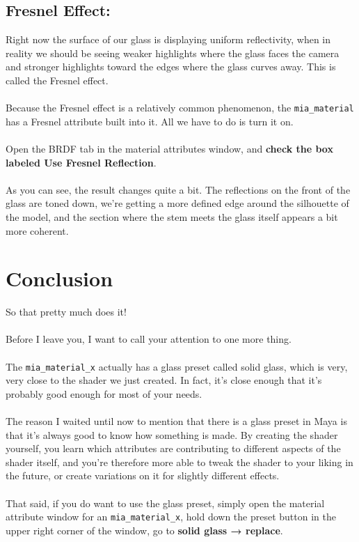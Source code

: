 \documentclass[10pt,a4paper]{article}
\begin{document}
\subsection{Fresnel Effect:}
Right now the surface of our glass is displaying uniform reflectivity, when in reality we should be seeing weaker highlights where the glass faces the camera and stronger highlights toward the edges where the glass curves away. This is called the Fresnel effect.
\\
\\
Because the Fresnel effect is a relatively common phenomenon, the \lstinline{mia_material} has a Fresnel attribute built into it. All we have to do is turn it on.
\\
\\
Open the BRDF tab in the material attributes window, and \textbf{check the box labeled Use Fresnel Reflection}.
\\
\\
As you can see, the result changes quite a bit. The reflections on the front of the glass are toned down, we're getting a more defined edge around the silhouette of the model, and the section where the stem meets the glass itself appears a bit more coherent.

\section{Conclusion}
So that pretty much does it!
\\
\\
Before I leave you, I want to call your attention to one more thing.
\\
\\
The \lstinline{mia_material_x} actually has a glass preset called solid glass, which is very, very close to the shader we just created. In fact, it's close enough that it's probably good enough for most of your needs.
\\
\\
The reason I waited until now to mention that there is a glass preset in Maya is that it's always good to know how something is made. By creating the shader yourself, you learn which attributes are contributing to different aspects of the shader itself, and you're therefore more able to tweak the shader to your liking in the future, or create variations on it for slightly different effects.
\\
\\
That said, if you do want to use the glass preset, simply open the material attribute window for an \lstinline{mia_material_x}, hold down the preset button in the upper right corner of the window, go to \textbf{solid glass → replace}.
\end{document}
